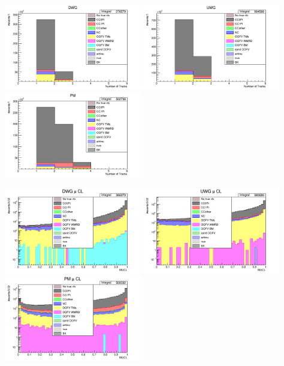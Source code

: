 \documentclass[%
 reprint,
 amsmath,amssymb,
 aps,
]{revtex4-2}
\begin{document}
    \includegraphics[width=0.45\textwidth]{images/num_of_vtx_reco_tracks_wgbm_topo_DWG_accum_level[][26]_data_mc.png}
    \includegraphics[width=0.45\textwidth]{images/num_of_vtx_reco_tracks_wgbm_topo_UWG_accum_level[][16]_data_mc.png}
    \includegraphics[width=0.45\textwidth]{images/num_of_vtx_reco_tracks_wgbm_topo_PM_accum_level[][06]_data_mc.png}

    \includegraphics[width=0.45\textwidth]{images/mucl_dwg_wgbm_topo_DWG_accum_level[][26]_data_mc.png}
    \includegraphics[width=0.45\textwidth]{images/mucl_uwg_wgbm_topo_UWG_accum_level[][16]_data_mc.png}
    \includegraphics[width=0.45\textwidth]{images/mucl_pm_wgbm_topo_PM_accum_level[][06]_data_mc.png}
\end{document}

